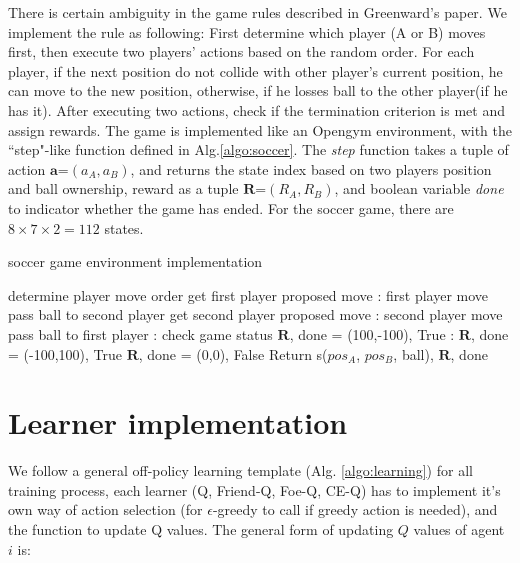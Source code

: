 \documentclass[conference]{IEEEtran}
\begin{document}
There is certain ambiguity in the game rules described in Greenward's paper\cite{greenwald2003correlated}. We implement the rule as following: First determine which player (A or B) moves first, then execute two players' actions based on the random order. For each player, if the next position do not collide with other player's current position, he can move to the new position, otherwise, if he losses ball to the other player(if he has it). After executing two actions, check if the termination criterion is met and assign rewards. The game is implemented like an Opengym environment, with the ``step"-like function defined in Alg.\ref{algo:soccer}. The \textit{step} function takes a tuple of action $\mathbf{a}$=$(a_A,a_B)$, and returns the state index based on two players position and ball ownership, reward as a tuple $\mathbf{R}$=$(R_A,R_B)$, and boolean variable \textit{done} to indicator whether the game has ended. For the soccer game, there are $8\times7\times2=112$ states.

\begin{algorithm}[h!]
	\caption{soccer game environment implementation}
	\begin{algorithmic}
		\State determine player move order
		\State get first player proposed move
		:
			\State first player move
			\State pass ball to second player
		\EndIf
		\State get second player proposed move
		:
		\State second player move
		\State pass ball to first player
		\EndIf
		: 		\Comment check game status
			\State $\mathbf{R}$, done = (100,-100), True
		:
			\State $\mathbf{R}$, done = (-100,100), True
		\Else
			\State $\mathbf{R}$, done = (0,0), False
		\EndIf
		\State Return s($pos_A$, $pos_B$, ball), $\mathbf{R}$, done
		\EndFunction
	\end{algorithmic}
	\label{algo:soccer}
\end{algorithm}

\section{Learner implementation}
We follow a general off-policy learning template (Alg. \ref{algo:learning}) for all training process, each learner (Q, Friend-Q, Foe-Q, CE-Q) has to implement it's own way of action selection (for $\epsilon$-greedy to call if greedy action is needed), and the function to update Q values. The general form of updating $Q$ values of agent $i$ is:
\end{document}
